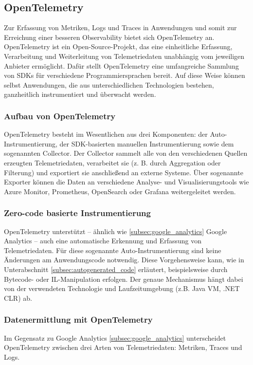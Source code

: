 \subsection{OpenTelemetry}
\label{subsec:open_telemetry}
Zur Erfassung von Metriken, Logs und Traces in Anwendungen und somit zur Erreichung einer besseren Observability bietet sich OpenTelemetry \cite{opentelemetry_what_is} an. OpenTelemetry ist ein Open-Source-Projekt, das eine einheitliche Erfassung, Verarbeitung und Weiterleitung von Telemetriedaten unabhängig vom jeweiligen Anbieter ermöglicht. Dafür stellt OpenTelemetry eine umfangreiche Sammlung von SDKs für verschiedene Programmiersprachen bereit. Auf diese Weise können selbst Anwendungen, die aus unterschiedlichen Technologien bestehen, ganzheitlich instrumentiert und überwacht werden.

\subsubsection{Aufbau von OpenTelemetry}
OpenTelemetry besteht im Wesentlichen aus drei Komponenten: der Auto-Instrumentierung, der SDK-basierten manuellen Instrumentierung sowie dem sogenannten Collector. Der Collector sammelt alle von den verschiedenen Quellen erzeugten Telemetriedaten, verarbeitet sie (z. B. durch Aggregation oder Filterung) und exportiert sie anschließend an externe Systeme. Über sogenannte Exporter können die Daten an verschiedene Analyse- und Visualisierungstools wie Azure Monitor, Prometheus, OpenSearch oder Grafana weitergeleitet werden.

\subsubsection{Zero-code basierte Instrumentierung}
OpenTelemetry unterstützt – ähnlich wie \ref{subsec:google_analytics} Google Analytics – auch eine automatische Erkennung und Erfassung von Telemetriedaten. Für diese sogenannte {Auto-Instrumentierung} sind keine Änderungen am Anwendungscode notwendig. Diese Vorgehensweise kann, wie in Unterabschnitt \ref{subsec:autogenerated_code} erläutert, beispielsweise durch Bytecode- oder IL-Manipulation erfolgen. Der genaue Mechanismus hängt dabei von der verwendeten Technologie und Laufzeitumgebung (z.B. Java VM, .NET CLR) ab.

\subsubsection{Datenermittlung mit OpenTelemetry}
Im Gegensatz zu Google Analytics \ref{subsec:google_analytics} unterscheidet OpenTelemetry zwischen drei Arten von Telemetriedaten: Metriken, Traces und Logs.

